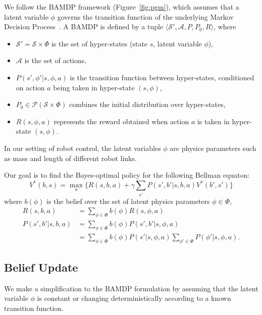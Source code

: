 \documentclass{article}
\newcommand{\figref}[1]{Figure~\ref{#1}}%
\begin{document}
We follow the BAMDP framework (\figref{fig:pgm}), which assumes that a latent variable $\phi$ governs the transition function of the underlying Markov Decision Process~\cite{ghavamzadeh2015bayesian, ross2008bayes, guez2012efficient}.
A BAMDP is defined by a tuple $\langle \mathcal{S}', \mathcal{A}, P, P_0, R \rangle$, where
\begin{itemize}
\item $\mathcal{S'} = \mathcal{S}\times \Phi$ is the set of hyper-states (state $s$, latent variable $\phi$),
\item $\mathcal{A}$ is the set of actions,
\item $P(s',\phi'|s, \phi, a)$ is the transition function between hyper-states, conditioned
on action $a$ being taken in hyper-state $(s, \phi)$,
\item $P_0\in \mathcal{P}(\mathcal{S} \times \Phi)$ combines the initial distribution over hyper-states,
\item $R(s, \phi, a)$ represents the reward obtained when action $a$ is
taken in hyper-state $(s,\phi)$.
\end{itemize}
In our setting of robot control, the latent variables $\phi$ are physics parameters such as mass and length of different robot links.

Our goal is to find the Bayes-optimal policy for the following Bellman equaton:
\begin{equation}\label{eq:rl}
V^*(b, s) = \max_a \bigg\{R(s, b, a) + \gamma \sum_{s'}P(s', b'|s, b, a)V^*(b', s') \bigg\}
\end{equation}
where $b(\phi)$ is the belief over the set of latent physics parameters $\phi \in \Phi$,
\begin{align*}
R(s, b, a)
  &= \sum_{\phi \in \Phi} b(\phi) R(s, \phi, a) \\
P(s', b' | s, b, a)
  &= \sum_{\phi \in \Phi} b(\phi) P(s', b' | s, \phi, a) \\
  &= \sum_{\phi \in \Phi} b(\phi) P(s' | s, \phi, a) \sum_{\phi' \in \Phi} P(\phi' | s, \phi, a).
\end{align*}


\subsection{Belief Update}

We make a simplification to the BAMDP formulation by assuming that the latent variable $\phi$ is constant or changing deterministically according to a known transition function.
\end{document}
